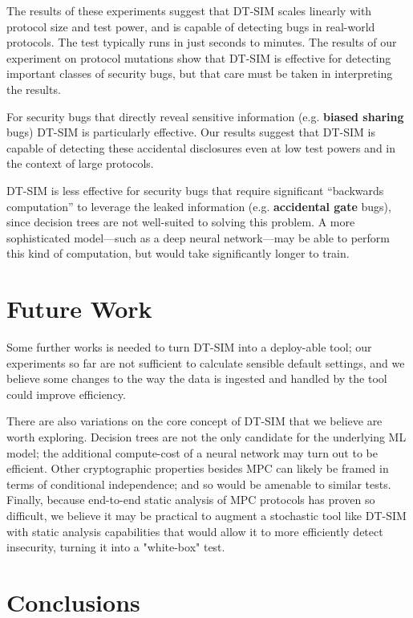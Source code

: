 \documentclass[compsoc, conference, a4paper, 10pt, times]{IEEEtran}
\newcommand{\toolname}{\textsc{DT-SIM}\xspace}
\begin{document}
The results of these experiments suggest that \toolname scales linearly with protocol size and test power, and is capable of detecting bugs in real-world protocols. The test typically runs in just seconds to minutes. The results of our experiment on protocol mutations show that \toolname is effective for detecting important classes of security bugs, but that care must be taken in interpreting the results.

For security bugs that directly reveal sensitive information (e.g. \textbf{biased sharing} bugs) \toolname is particularly effective. Our results suggest that \toolname is capable of detecting these accidental disclosures even at low test powers and in the context of large protocols.

\toolname is less effective for security bugs that require significant ``backwards computation'' to leverage the leaked information (e.g. \textbf{accidental gate} bugs), since decision trees are not well-suited to solving this problem. A more sophisticated model---such as a deep neural network---may be able to perform this kind of computation, but would take significantly longer to train.

\section{Future Work}

Some further works is needed to turn \toolname into a deploy-able tool;
our experiments so far are not sufficient to calculate sensible default settings,
and we believe some changes to the way the data is ingested and handled by the tool could improve efficiency.

There are also variations on the core concept of \toolname that we believe are worth exploring.
Decision trees are not the only candidate for the underlying ML model;
the additional compute-cost of \eg{} a neural network may turn out to be efficient.
Other cryptographic properties besides MPC can likely be framed in terms of conditional independence;
and so would be amenable to similar tests.
Finally, because end-to-end static analysis of MPC protocols has proven so difficult,
we believe it may be practical to augment a stochastic tool like \toolname with static analysis capabilities
that would allow it to more efficiently detect insecurity, turning it into a "white-box" test.


\section{Conclusions}
\end{document}
